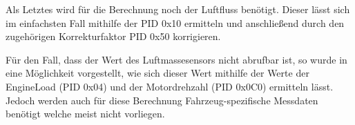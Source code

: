 Als Letztes wird für die Berechnung noch der Luftfluss benötigt. Dieser lässt sich im einfachsten Fall mithilfe der \ac{PID} 0x10 ermitteln und anschließend durch den zugehörigen Korrekturfaktor \ac{PID} 0x50 korrigieren.

Für den Fall, dass der Wert des Luftmassesensors nicht abrufbar ist, so wurde in \cite{obdConsumption} eine Möglichkeit vorgestellt, wie sich dieser Wert mithilfe der Werte der EngineLoad (\ac{PID} 0x04) und der Motordrehzahl (\ac{PID} 0x0C0) ermitteln lässt. Jedoch werden auch für diese Berechnung Fahrzeug-spezifische Messdaten benötigt welche meist nicht vorliegen.

 
 
 
 
